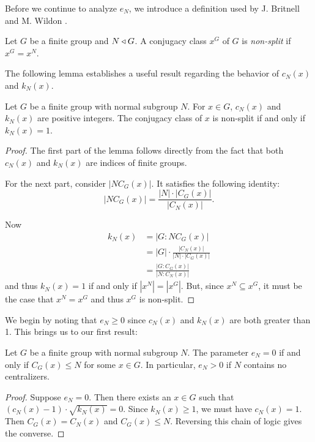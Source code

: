 \documentclass[main.tex]{subfiles}
\begin{document}
 Before we continue to analyze $e_N$, we introduce a definition used by J. Britnell and M. Wildon \cite{britnellwildonarticle}.

\hss

\begin{definition}
Let $G$ be a finite group and $N \triangleleft G$. A conjugacy class $x^G$ of $G$ is \emph{non-split} if $x^G = x^N$.
\end{definition}

\hss

The following lemma establishes a useful result regarding the behavior of $c_N(x)$ and $k_N(x)$.

\begin{lemma}\label{kn1}
Let $G$ be a finite group with normal subgroup $N$. For $x \in G$, $c_N(x)$ and $k_N(x)$ are positive integers. The conjugacy class of $x$ is non-split if and only if $k_N(x) = 1$.
\end{lemma}

\begin{proof}
The first part of the lemma follows directly from the fact that both $c_N(x)$ and $k_N(x)$ are indices of finite groups.

For the next part, consider $|NC_G(x)|$. It satisfies the following identity:
$$|NC_G(x)| = \frac{|N| \cdot |C_G(x)|}{|C_N(x)|}\text{.}$$

Now
\begin{align*}
k_N(x) &= |G : NC_G(x)| \\
&= |G| \cdot \frac{|C_N(x)|}{|N| \cdot |C_G(x)|} \\
&= \frac{|G : C_G(x)|}{|N : C_N(x)|}
\end{align*}
and thus $k_N(x) = 1$ if and only if $|x^N| = |x^G|$. But, since $x^N \subseteq x^G$, it must be the case that $x^N = x^G$ and thus $x^G$ is non-split.
\end{proof}

We begin by noting that $e_N \ge 0$ since $c_N(x)$ and $k_N(x)$ are both greater than 1. This brings us to our first result:

\begin{theorem}\label{en0}
Let $G$ be a finite group with normal subgroup $N$. The parameter $e_N = 0$ if and only if $C_G(x) \le N$ for some $x \in G$. In particular, $e_N > 0$ if $N$ contains no centralizers.
\end{theorem}

\begin{proof}
Suppose $e_N = 0$. Then there exists an $x \in G$ such that $(c_N(x) - 1) \cdot \sqrt{k_N(x)} = 0$. Since $k_N(x) \ge 1$, we must have $c_N(x) = 1$. Then $C_G(x) = C_N(x)$ and $C_G(x) \le N$. Reversing this chain of logic gives the converse.
\end{proof}
\end{document}
